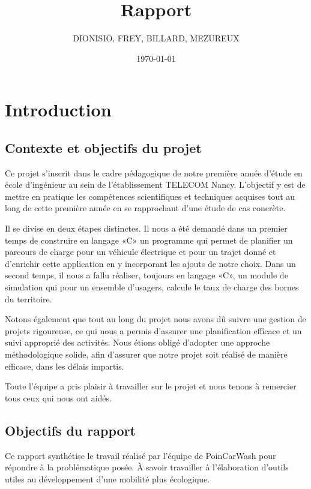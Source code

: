 \documentclass[a4paper, 12pt]{report}
\title{Rapport}
\author{DIONISIO, FREY, BILLARD, MEZUREUX}
\date{\today}
\begin{document}
\maketitle
\dominitoc
{}
\tableofcontents

\chapter{Introduction}
\minitoc
{}
\clearpage

\section{Contexte et objectifs du projet}

Ce projet s'inscrit dans le cadre pédagogique de notre première année d'étude en école d'ingénieur au sein de l'établissement TELECOM Nancy. L'objectif y est de mettre en pratique les compétences scientifiques et techniques acquises tout au long de cette première année en se rapprochant d'une étude de cas concrète.
\bigskip

Il se divise en deux étapes distinctes. Il nous a été demandé dans un premier temps de construire en langage «C» un programme qui permet de planifier un parcours de charge pour un véhicule électrique et pour un trajet donné et d'enrichir cette application en y incorporant les ajouts de notre choix. Dans un second temps, il nous a fallu réaliser, toujours en langage «C», un module de simulation qui pour un ensemble d'usagers, calcule le taux de charge des bornes du territoire.
\bigskip

Notons également que tout au long du projet nous avons dû suivre une gestion de projets rigoureuse, ce
qui nous a permis d’assurer une planification efficace et un suivi approprié des activités. Nous étions
obligé d'adopter une approche méthodologique solide, afin d’assurer que notre projet soit réalisé de manière efficace, dans les délais impartis.
\bigskip

Toute l’équipe a pris plaisir à travailler sur le projet et nous tenons à remercier tous ceux qui nous
ont aidés.

\section{Objectifs du rapport}

Ce rapport synthétise le travail réalisé par l'équipe de PoinCarWash pour répondre à la problématique posée. À savoir travailler à l'élaboration d'outils utiles au développement d'une mobilité plus écologique.
\end{document}
